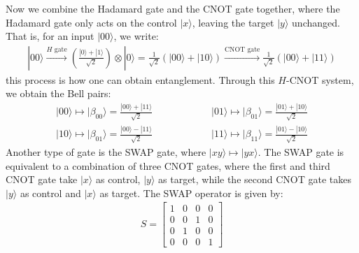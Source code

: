 \documentclass[11pt]{book}
\theoremstyle{break}
\theoremstyle{break}
\newcommand{\bmat}[1]{\begin{bmatrix} #1 \end{bmatrix}}
\newcommand{\txtarrow}[1]{\xrightarrow{\text{#1}}}
\begin{document}
Now we combine the Hadamard gate and the CNOT gate together,  where the Hadamard gate only acts on the control $|x\rangle$, leaving the target $|y\rangle $ unchanged. That is, for an input $|00\rangle$, we write:
\begin{align*}
|00\rangle \txtarrow{$H$ gate} \left(\frac{|0\rangle + |1\rangle}{\sqrt{2}}\right)\otimes |0\rangle = \frac{1}{\sqrt{2}}\left( |00\rangle + |10\rangle\right)  \txtarrow{CNOT gate} \frac{1}{\sqrt{2}}\left( |00\rangle + |11\rangle\right)
\end{align*}
this process is how one can obtain entanglement. Through this $H$-CNOT system, we obtain the Bell pairs:
\begin{align*}
|00\rangle \mapsto |\beta_{00}\rangle = \frac{|00\rangle + |11\rangle}{\sqrt{2}} \qquad\qquad\qquad |01\rangle \mapsto |\beta_{01}\rangle = \frac{|01\rangle + |10\rangle}{\sqrt{2}}
\end{align*}
\begin{align*}
|10\rangle \mapsto |\beta_{01}\rangle = \frac{|00\rangle - |11\rangle}{\sqrt{2}} \qquad\qquad\qquad
|11\rangle \mapsto |\beta_{11}\rangle = \frac{|01\rangle - |10\rangle}{\sqrt{2}}
\end{align*}
Another type of gate is the SWAP gate, where $|xy\rangle \mapsto |yx\rangle$. The SWAP gate is equivalent to a combination of three CNOT gates, where the first and third CNOT gate take $|x\rangle$ as control, $|y\rangle$ as target, while the second CNOT gate takes $|y\rangle $ as control and $|x\rangle $ as target. The SWAP operator is given by:
\begin{align*}
S = \bmat{1 & 0 & 0 & 0 \\
0 & 0 & 1 & 0\\
0 & 1 & 0 & 0\\
0 & 0 & 0 & 1}
\end{align*}
\end{document}
